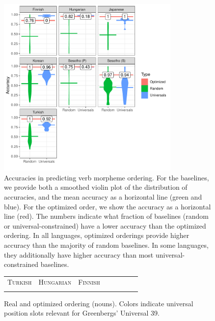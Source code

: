 \documentclass[man]{apa7}
\begin{document}
\begin{figure}[]
    \centering
\includegraphics[width=0.8\textwidth]{figures/accuracies_verbs.pdf}
    \caption{Accuracies in predicting verb morpheme ordering.
    For the baselines, we provide both a smoothed violin plot of the distribution of accuracies, and the mean accuracy as a horizontal line (green and blue). For the optimized order, we show the accuracy as a horizontal line (red).
	The numbers indicate what fraction of baselines (random or universal-constrained) have a lower accuracy than the optimized ordering.
	In all languages, optimized orderings provide higher accuracy than the majority of random baselines. In some languages, they additionally have higher accuracy than most universal-constrained baselines.}
    \label{tab:optimized_acc_verbs}
\end{figure}


\begin{figure}[]
\begin{tabular}{cccccccc}
\textsc{Turkish} & \textsc{Hungarian} & \textsc{Finnish} \\
\begin{minipage}{.3\textwidth}
  
    \end{minipage}
  &
  \begin{minipage}{.3\textwidth}
  
    \end{minipage}
  &
  \begin{minipage}{.3\textwidth}
  
  \end{minipage}
  \end{tabular}
  
    \caption{Real and optimized ordering (nouns). Colors indicate universal position slots relevant for Greenbergs' Universal 39.}
    \label{fig:real_and_optimized_nouns}
\end{figure}
\end{document}
